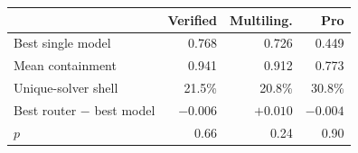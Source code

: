 %
%
\begin{tabular}{@{}lrrr@{}}
\toprule
 & Verified & Multiling. & Pro \\
\midrule
Best single model      & 0.768 & 0.726 & 0.449 \\
Mean containment       & 0.941 & 0.912 & 0.773 \\
Unique-solver shell    & 21.5\% & 20.8\% & 30.8\% \\
\addlinespace
Best router $-$ best model & $-0.006$ & $+0.010$ & $-0.004$ \\
\quad $p$              & 0.66 & 0.24 & 0.90 \\
\bottomrule
\end{tabular}
